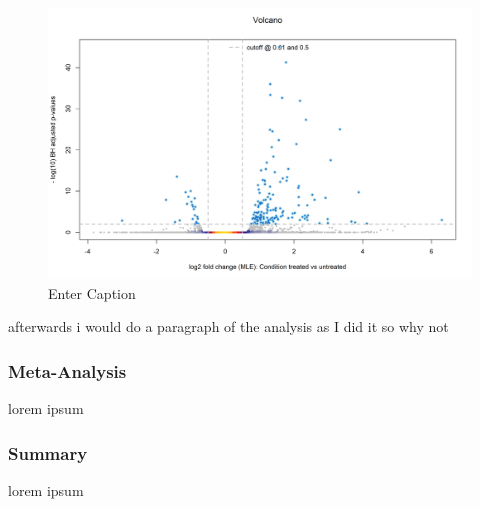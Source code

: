 \begin{figure}
    \centering
    \includegraphics[width=1\linewidth]{08. Chapter 3/Figs/02. Bovine/01. rnaseq volcano.png}
    \caption{Enter Caption}
    \label{fig:volcano2}
\end{figure}

afterwards i would do a paragraph of the analysis as I did it so why not

\subsubsection{Meta-Analysis}
lorem ipsum

\subsubsection{Summary}
lorem ipsum
